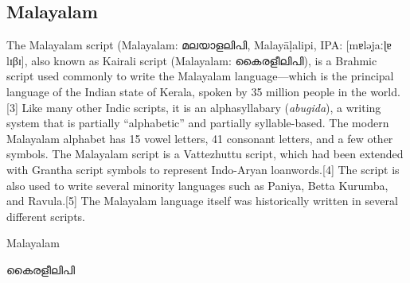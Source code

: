 \subsection{Malayalam}

\newfontfamily{}

\def\malamtext#1{{\malayam#1}}

The Malayalam script (Malayalam: \malamtext{മലയാളലിപി}, Malayāḷalipi, IPA: [mɐləjaːɭɐ lɪβɪ], also known as Kairali script (Malayalam: \malamtext{കൈരളീലിപി}), is a Brahmic script used commonly to write the Malayalam language—which is the principal language of the Indian state of Kerala, spoken by 35 million people in the world.[3] Like many other Indic scripts, it is an alphasyllabary (\textit{abugida}), a writing system that is partially “alphabetic” and partially syllable-based. The modern Malayalam alphabet has 15 vowel letters, 41 consonant letters, and a few other symbols. The Malayalam script is a Vattezhuttu script, which had been extended with Grantha script symbols to represent Indo-Aryan loanwords.[4] The script is also used to write several minority languages such as Paniya, Betta Kurumba, and Ravula.[5] The Malayalam language itself was historically written in several different scripts.

\begin{scriptexample}[]{Malayalam}
\centerline{\Huge\malamtext{കൈരളീലിപി}}
\end{scriptexample}